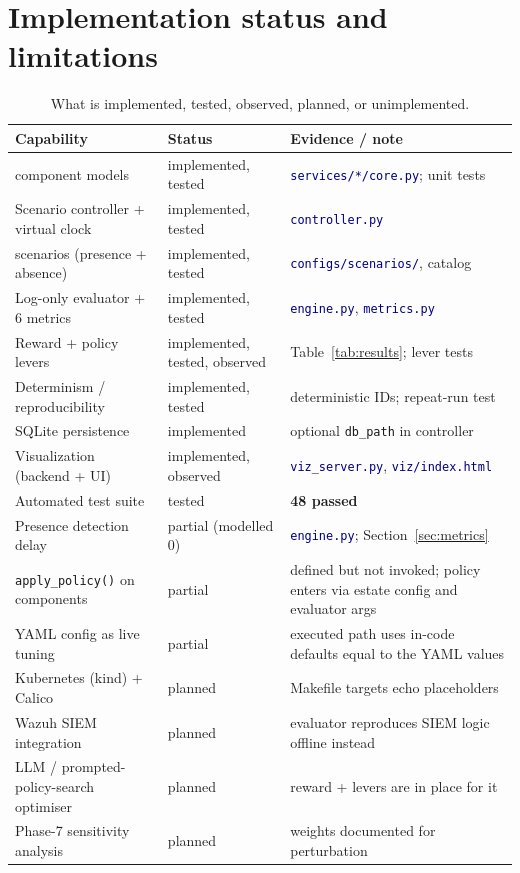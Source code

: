 \documentclass[11pt]{article}
\newcommand{\code}[1]{\texttt{\small #1}}
\newcommand{\file}[1]{\textcolor{navy}{\texttt{\small #1}}}
\begin{document}
\section{Implementation status and limitations}
\label{sec:status}
\begin{table}[h]
\centering
\caption{What is implemented, tested, observed, planned, or unimplemented.}
\label{tab:status}
\small
\begin{tabular}{>{\RaggedRight\arraybackslash}p{5.2cm} p{2.4cm} >{\RaggedRight\arraybackslash}p{6.0cm}}
\toprule
\textbf{Capability} & \textbf{Status} & \textbf{Evidence / note}\\
\midrule
5 component models & implemented, tested & \file{services/*/core.py}; unit tests\\
Scenario controller + virtual clock & implemented, tested & \file{controller.py}\\
7 scenarios (presence + absence) & implemented, tested & \file{configs/scenarios/}, catalog\\
Log-only evaluator + 6 metrics & implemented, tested & \file{engine.py}, \file{metrics.py}\\
Reward + policy levers & implemented, tested, observed & Table~\ref{tab:results}; lever tests\\
Determinism / reproducibility & implemented, tested & deterministic IDs; repeat-run test\\
SQLite persistence & implemented & optional \code{db\_path} in controller\\
Visualization (backend + UI) & implemented, observed & \file{viz\_server.py}, \file{viz/index.html}\\
Automated test suite & tested & \textbf{48 passed}\\
\midrule
Presence detection delay & partial (modelled 0) & \file{engine.py}; Section~\ref{sec:metrics}\\
\code{apply\_policy()} on components & partial & defined but not invoked; policy enters via estate config and evaluator args\\
YAML config as live tuning & partial & executed path uses in-code defaults equal to the YAML values\\
\midrule
Kubernetes (kind) + Calico & planned & Makefile targets echo placeholders\\
Wazuh SIEM integration & planned & evaluator reproduces SIEM logic offline instead\\
LLM / prompted-policy-search optimiser & planned & reward + levers are in place for it\\
Phase-7 sensitivity analysis & planned & weights documented for perturbation\\
\bottomrule
\end{tabular}
\end{table}
\end{document}
